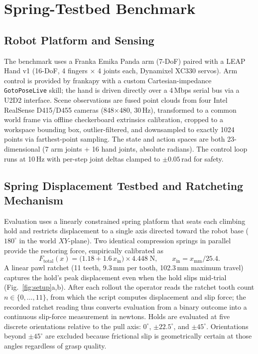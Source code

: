 \documentclass[letterpaper, 10pt, journal, twoside]{IEEEtran}
\begin{document}
\section{Spring-Testbed Benchmark}
\label{sec:benchmark}

\subsection{Robot Platform and Sensing}
The benchmark uses a Franka Emika Panda arm (7-DoF) paired with a LEAP Hand v1
(16-DoF, 4 fingers $\times$ 4 joints each, Dynamixel XC330 servos). Arm control is
provided by frankapy with a custom Cartesian-impedance \texttt{GotoPoseLive} skill;
the hand is driven directly over a 4\,Mbps serial bus via a U2D2 interface. Scene
observations are fused point clouds from four Intel RealSense D415/D455 cameras
(848$\times$480, 30\,Hz), transformed to a common world frame via offline checkerboard
extrinsics calibration, cropped to a workspace bounding box, outlier-filtered, and
downsampled to exactly 1024 points via farthest-point sampling. The state and action
spaces are both 23-dimensional (7 arm joints + 16 hand joints, absolute radians).
The control loop runs at 10\,Hz with per-step joint deltas clamped to
$\pm 0.05$\,rad for safety.

\subsection{Spring Displacement Testbed and Ratcheting Mechanism}
\label{sec:testbed}
Evaluation uses a linearly constrained spring platform that seats each climbing hold
and restricts displacement to a single axis directed toward the robot base
($180^\circ$ in the world $XY$-plane). Two identical compression springs in parallel
provide the restoring force, empirically calibrated as
\[
F_{\text{total}}(x) = \bigl(1.18 + 1.6\, x_\text{in}\bigr) \times 4.448 \;\text{N},
\qquad x_\text{in} = x_{\text{mm}}/25.4.
\]
A linear pawl ratchet (11 teeth, 9.3\,mm per tooth, 102.3\,mm maximum travel) captures
the hold's peak displacement even when the hold slips mid-trial
(Fig.~\ref{fig:setup}a,b). After each rollout the operator reads the ratchet tooth count
$n \in \{0, \dots, 11\}$, from which the script computes displacement and slip force;
the recorded ratchet reading thus converts evaluation from a binary outcome into a
continuous slip-force measurement in newtons. Holds are evaluated at five discrete
orientations relative to the pull axis: $0^\circ$, $\pm 22.5^\circ$, and
$\pm 45^\circ$. Orientations beyond $\pm 45^\circ$ are excluded because frictional slip
is geometrically certain at those angles regardless of grasp quality.
\end{document}
